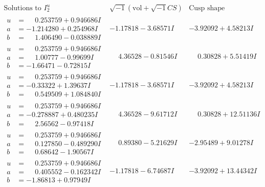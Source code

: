 \documentclass[1p]{elsarticle_modified}
\theoremstyle{definition}
\newcommand{\I}{\sqrt{-1}}
\begin{document}
$$\begin{array}{c|c|c}  
\text{Solutions to }I^u_{2}& \I (\text{vol} + \sqrt{-1}CS) & \text{Cusp shape}\\
 \hline 
\begin{aligned}
u &= \phantom{-}0.253759 + 0.946686 I \\
a &= -1.214280 + 0.254968 I \\
b &= \phantom{-}1.406490 - 0.038889 I\end{aligned}
 & -1.17818 - 3.68571 I & -3.92092 + 4.58213 I \\ \hline\begin{aligned}
u &= \phantom{-}0.253759 + 0.946686 I \\
a &= \phantom{-}1.00777 - 0.99699 I \\
b &= -1.66471 - 0.72815 I\end{aligned}
 & \phantom{-}4.36528 - 0.81546 I & \phantom{-}0.30828 + 5.51419 I \\ \hline\begin{aligned}
u &= \phantom{-}0.253759 + 0.946686 I \\
a &= -0.33322 + 1.39637 I \\
b &= \phantom{-}0.549509 + 1.084840 I\end{aligned}
 & -1.17818 - 3.68571 I & -3.92092 + 4.58213 I \\ \hline\begin{aligned}
u &= \phantom{-}0.253759 + 0.946686 I \\
a &= -0.278887 + 0.480235 I \\
b &= \phantom{-}2.56562 - 0.97418 I\end{aligned}
 & \phantom{-}4.36528 - 9.61712 I & \phantom{-}0.30828 + 12.51136 I \\ \hline\begin{aligned}
u &= \phantom{-}0.253759 + 0.946686 I \\
a &= \phantom{-}0.127850 - 0.489290 I \\
b &= \phantom{-}0.68642 - 1.90567 I\end{aligned}
 & \phantom{-}0.89380 - 5.21629 I & -2.95489 + 9.01278 I \\ \hline\begin{aligned}
u &= \phantom{-}0.253759 + 0.946686 I \\
a &= \phantom{-}0.405552 - 0.162342 I \\
b &= -1.86813 + 0.97949 I\end{aligned}
 & -1.17818 - 6.74687 I & -3.92092 + 13.44342 I \\ \hline\begin{aligned}

\end{aligned}
\end{array}$$
\end{document}
